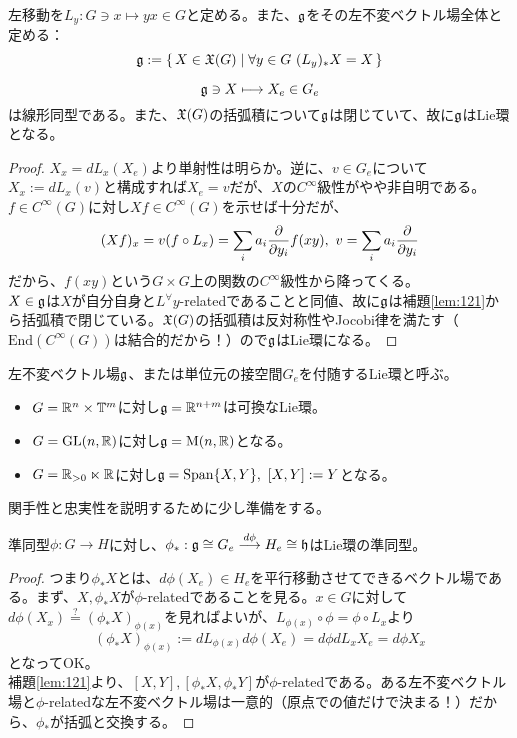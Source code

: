 \begin{defi}[平行移動]
    左移動を$L_y:G\ni x\mapsto yx\in G$と定める。また、$\mathfrak{g}$をその左不変ベクトル場全体と定める：
    \[\g:=\set{X\in\X(G)}{\forall y\in G\ (L_y)_*X=X}\]
\end{defi}
\begin{prop}
    \[\mathfrak{g}\ni X\longmapsto X_e\in G_e\]
    は線形同型である。また、$\mathfrak{X}(G)$の括弧積について$\mathfrak{g}$は閉じていて、故に$\mathfrak{g}$はLie環となる。
\end{prop}
\begin{proof}
    $X_x=dL_x(X_e)$より単射性は明らか。逆に、$v\in G_e$について$X_x:=dL_x(v)$と構成すれば$X_e=v$だが、$X$の$C^\infty$級性がやや非自明である。$f\in C^\infty(G)$に対し$Xf\in C^\infty(G)$を示せば十分だが、
    \[(Xf)_x=v(f\circ L_x)=\sum_i a_i\frac{\partial }{\partial y_i}f(xy),\ v=\sum_i a_i\frac{\partial }{\partial y_i}\]
    だから、$f(xy)$という$G\times G$上の関数の$C^\infty$級性から降ってくる。\\
    $X\in\mathfrak{g}$は$X$が自分自身と$L{{}^\forall y}$-relatedであることと同値、故に$\mathfrak{g}$は補題\ref{lem:121}から括弧積で閉じている。$\mathfrak{X}(G)$の括弧積は反対称性やJocobi律を満たす（$\mathrm{End}(C^\infty(G))$は結合的だから！）ので$\mathfrak{g}$はLie環になる。
\end{proof}
\begin{defi}[Lie群に対応するLie環]
    左不変ベクトル場$\mathfrak{g}$、または単位元の接空間$G_e$を付随するLie環と呼ぶ。
\end{defi}

\begin{eg}
    \begin{itemize}
        \item $G=\mathbb{R}^n\times\mathbb{T}^m$に対し$\mathfrak{g}=\mathbb{R}^{n+m}$は可換なLie環。
        \item $G=\mathrm{GL}(n,\mathbb{R})$に対し$\mathfrak{g}=\mathrm{M}(n,\mathbb{R})$となる。
        \item $G=\mathbb{R}_{>0}\ltimes\mathbb{R}$に対し$\mathfrak{g}=\mathrm{Span}\{X,Y\},\ [X,Y]:=Y$となる。
    \end{itemize}
\end{eg}
関手性と忠実性を説明するために少し準備をする。
\begin{thm}[関手性]
    準同型$\phi:G\to H$に対し、$\phi_*:\mathfrak{g}\cong G_e\overset{d\phi}{\longrightarrow}H_e\cong\mathfrak{h}$はLie環の準同型。
\end{thm}
\begin{proof}
    つまり$\phi_*X$とは、$d\phi(X_e)\in H_e$を平行移動させてできるベクトル場である。まず、$X,\phi_*X$が$\phi$-relatedであることを見る。$x\in G$に対して$d\phi(X_x)\overset{?}{=}(\phi_*X)_{\phi(x)}$を見ればよいが、$L_{\phi(x)}\circ\phi=\phi\circ L_x$より
    \[(\phi_*X)_{\phi(x)}:=dL_{\phi(x)}d\phi(X_e)=d\phi dL_xX_e=d\phi X_x\]
    となってOK。\\
    補題\ref{lem:121}より、$[X,Y],[\phi_*X,\phi_*Y]$が$\phi$-relatedである。ある左不変ベクトル場と$\phi$-relatedな左不変ベクトル場は一意的（原点での値だけで決まる！）だから、$\phi_*$が括弧と交換する。
\end{proof}


